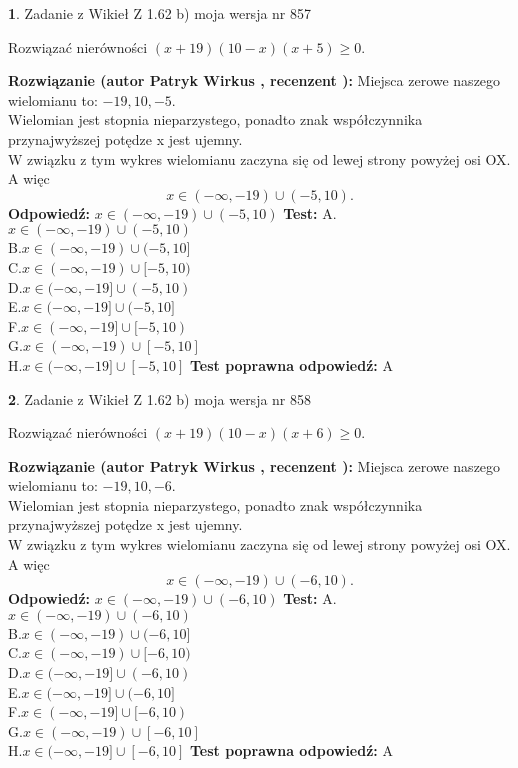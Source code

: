 \documentclass[12pt, a4paper]{article}
\theoremstyle{definition} %
\newtheorem{zad}{}
\newcommand{\zadStart}[1]{\begin{zad}#1\newline}
\newcommand{\zadStop}{\end{zad}}
\newcommand{\rozwStart}[2]{\noindent \textbf{Rozwiązanie (autor #1 , recenzent #2): }\newline}
\newcommand{\rozwStop}{\newline}
\newcommand{\odpStart}{\noindent \textbf{Odpowiedź:}\newline}
\newcommand{\odpStop}{\newline}
\newcommand{\testStart}{\noindent \textbf{Test:}\newline}
\newcommand{\testStop}{\newline}
\newcommand{\kluczStart}{\noindent \textbf{Test poprawna odpowiedź:}\newline}
\newcommand{\kluczStop}{\newline}
\begin{document}
\zadStart{Zadanie z Wikieł Z 1.62 b) moja wersja nr 857}

Rozwiązać nierówności $(x+19)(10-x)(x+5)\ge0$.
\zadStop
\rozwStart{Patryk Wirkus}{}
Miejsca zerowe naszego wielomianu to: $-19, 10, -5$.\\
Wielomian jest stopnia nieparzystego, ponadto znak współczynnika przy\linebreak najwyższej potędze x jest ujemny.\\ W związku z tym wykres wielomianu zaczyna się od lewej strony powyżej osi OX. A więc $$x \in (-\infty,-19) \cup (-5,10).$$
\rozwStop
\odpStart
$x \in (-\infty,-19) \cup (-5,10)$
\odpStop
\testStart
A.$x \in (-\infty,-19) \cup (-5,10)$\\
B.$x \in (-\infty,-19) \cup (-5,10]$\\
C.$x \in (-\infty,-19) \cup [-5,10)$\\
D.$x \in (-\infty,-19] \cup (-5,10)$\\
E.$x \in (-\infty,-19] \cup (-5,10]$\\
F.$x \in (-\infty,-19] \cup [-5,10)$\\
G.$x \in (-\infty,-19) \cup [-5,10]$\\
H.$x \in (-\infty,-19] \cup [-5,10]$
\testStop
\kluczStart
A
\kluczStop



\zadStart{Zadanie z Wikieł Z 1.62 b) moja wersja nr 858}

Rozwiązać nierówności $(x+19)(10-x)(x+6)\ge0$.
\zadStop
\rozwStart{Patryk Wirkus}{}
Miejsca zerowe naszego wielomianu to: $-19, 10, -6$.\\
Wielomian jest stopnia nieparzystego, ponadto znak współczynnika przy\linebreak najwyższej potędze x jest ujemny.\\ W związku z tym wykres wielomianu zaczyna się od lewej strony powyżej osi OX. A więc $$x \in (-\infty,-19) \cup (-6,10).$$
\rozwStop
\odpStart
$x \in (-\infty,-19) \cup (-6,10)$
\odpStop
\testStart
A.$x \in (-\infty,-19) \cup (-6,10)$\\
B.$x \in (-\infty,-19) \cup (-6,10]$\\
C.$x \in (-\infty,-19) \cup [-6,10)$\\
D.$x \in (-\infty,-19] \cup (-6,10)$\\
E.$x \in (-\infty,-19] \cup (-6,10]$\\
F.$x \in (-\infty,-19] \cup [-6,10)$\\
G.$x \in (-\infty,-19) \cup [-6,10]$\\
H.$x \in (-\infty,-19] \cup [-6,10]$
\testStop
\kluczStart
A
\kluczStop
\end{document}
